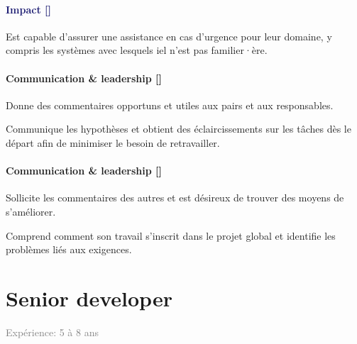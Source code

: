 \documentclass[a4paper, french, openany, 12pt]{book}
\newcommand\wis{\textcolor{MidnightBlue}{\textbf{Impact [\bsc{WIS}]}}}
\newcommand\cha{\textcolor{RawSienna}{\textbf{Communication \& leadership [\bsc{CHA}]}}}
\newcommand\xp[1]{\textcolor{Gray}{Expérience: {#1} ans}}
\begin{document}
\begin{multicols}{2}
  \subsubsection*{\wis}

  Est capable d'assurer une assistance en cas d'urgence pour leur domaine, y compris les systèmes avec lesquels iel 
  n'est pas familier·ère.

  \subsubsection*{\cha}

  Donne des commentaires opportuns et utiles aux pairs et aux responsables.

  Communique les hypothèses et obtient des éclaircissements sur les tâches dès le départ afin de minimiser le besoin de 
  retravailler.

  \subsubsection*{\cha}

  Sollicite les commentaires des autres et est désireux de trouver des moyens de s'améliorer.

  Comprend comment son travail s'inscrit dans le projet global et identifie les problèmes liés aux exigences.

\end{multicols}

\chapter{Senior developer}

\xp{5 à 8}
\end{document}
